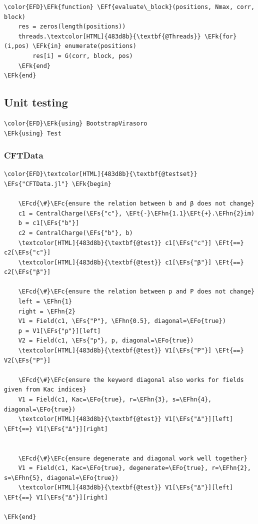 \documentclass[a4paper]{article}
\numberwithin{equation}{section}
\newcommand{\EFc}[1]{\textcolor{EFc}{#1}} %
\newcommand{\EFcd}[1]{\textcolor{EFcd}{#1}} %
\newcommand{\EFs}[1]{\textcolor{EFs}{#1}} %
\newcommand{\EFk}[1]{\textcolor{EFk}{#1}} %
\newcommand{\EFf}[1]{\textcolor{EFf}{#1}} %
\newcommand{\EFt}[1]{\textcolor{EFt}{#1}} %
\newcommand{\EFo}[1]{\textcolor{EFo}{#1}} %
\newcommand{\EFhn}[1]{\textcolor{EFhn}{#1}} %
\begin{document}
\begin{Code}
\begin{Verbatim}
\color{EFD}\EFk{function} \EFf{evaluate\_block}(positions, Nmax, corr, block)
    res = zeros(length(positions))
    threads.\textcolor[HTML]{483d8b}{\textbf{@Threads}} \EFk{for} (i,pos) \EFk{in} enumerate(positions)
        res[i] = G(corr, block, pos)
    \EFk{end}
\EFk{end}
\end{Verbatim}
\end{Code}
\subsection{Unit testing}
\label{sec:org0231e24}
\begin{Code}
\begin{Verbatim}
\color{EFD}\EFk{using} BootstrapVirasoro
\EFk{using} Test
\end{Verbatim}
\end{Code}
\subsubsection*{CFTData}
\label{sec:org32d0aac}

\begin{Code}
\begin{Verbatim}
\color{EFD}\textcolor[HTML]{483d8b}{\textbf{@testset}} \EFs{"CFTData.jl"} \EFk{begin}

    \EFcd{\#}\EFc{ensure the relation between b and β does not change}
    c1 = CentralCharge(\EFs{"c"}, \EFt{-}\EFhn{1.1}\EFt{+}.\EFhn{2}im)
    b = c1[\EFs{"b"}]
    c2 = CentralCharge(\EFs{"b"}, b)
    \textcolor[HTML]{483d8b}{\textbf{@test}} c1[\EFs{"c"}] \EFt{==} c2[\EFs{"c"}]
    \textcolor[HTML]{483d8b}{\textbf{@test}} c1[\EFs{"β"}] \EFt{==} c2[\EFs{"β"}]

    \EFcd{\#}\EFc{ensure the relation between p and P does not change}
    left = \EFhn{1}
    right = \EFhn{2}
    V1 = Field(c1, \EFs{"P"}, \EFhn{0.5}, diagonal=\EFo{true})
    p = V1[\EFs{"p"}][left]
    V2 = Field(c1, \EFs{"p"}, p, diagonal=\EFo{true})
    \textcolor[HTML]{483d8b}{\textbf{@test}} V1[\EFs{"P"}] \EFt{==} V2[\EFs{"P"}]

    \EFcd{\#}\EFc{ensure the keyword diagonal also works for fields given from Kac indices}
    V1 = Field(c1, Kac=\EFo{true}, r=\EFhn{3}, s=\EFhn{4}, diagonal=\EFo{true})
    \textcolor[HTML]{483d8b}{\textbf{@test}} V1[\EFs{"Δ"}][left] \EFt{==} V1[\EFs{"Δ"}][right]


    \EFcd{\#}\EFc{ensure degenerate and diagonal work well together}
    V1 = Field(c1, Kac=\EFo{true}, degenerate=\EFo{true}, r=\EFhn{2}, s=\EFhn{5}, diagonal=\EFo{true})
    \textcolor[HTML]{483d8b}{\textbf{@test}} V1[\EFs{"Δ"}][left] \EFt{==} V1[\EFs{"Δ"}][right]

\EFk{end}
\end{Verbatim}
\end{Code}
\end{document}
